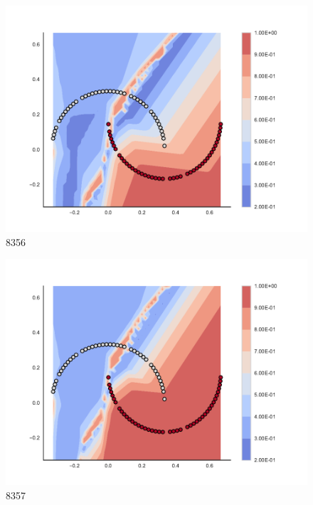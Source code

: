\begin{subfigure}[b]{0.09\textwidth}
    \includegraphics[clip, trim=2.35cm 1.75cm 4.5cm 0cm,width=\textwidth]{img/convergence/8356.pdf}
    \caption{8356}
    \label{fig:convergence_8356}
\end{subfigure}
%
\begin{subfigure}[b]{0.09\textwidth}
    \includegraphics[clip, trim=2.35cm 1.75cm 4.5cm 0cm,width=\textwidth]{img/convergence/8357.pdf}
    \caption{8357}
    \label{fig:convergence_8357}
\end{subfigure}
%
